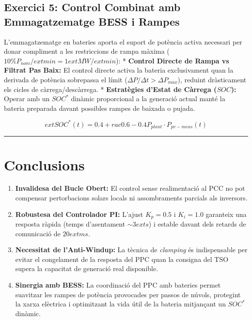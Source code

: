 \documentclass[
  catalan,
  letterpaper,
  DIV=11,
  numbers=noendperiod]{scrartcl}
\providecommand{\tightlist}{%
  \setlength{\itemsep}{0pt}\setlength{\parskip}{0pt}}
\begin{document}
\subsection{Exercici 5: Control Combinat amb Emmagatzematge BESS i
Rampes}\label{exercici-5-control-combinat-amb-emmagatzematge-bess-i-rampes}

L'emmagatzematge en bateries aporta el suport de potència activa
necessari per donar compliment a les restriccions de rampa màxima
(\(10\% P_{nom}/  ext{min} = 1    ext{ MW}/   ext{min}\)): *
\textbf{Control Directe de Rampa vs Filtrat Pas Baix:} El control
directe activa la bateria exclusivament quan la derivada de potència
sobrepassa el límit (\(\Delta P / \Delta t > \Delta P_{max}\)), reduint
dràsticament els cicles de càrrega/descàrrega. * \textbf{Estratègies
d'Estat de Càrrega (\(SOC\)):} Operar amb un \(SOC^*\) dinàmic
proporcional a la generació actual manté la bateria preparada davant
possibles rampes de baixada o pujada.

\[  ext{SOC}^*(t) = 0.4 + rac{0.6-0.4}{P_{plant}} \cdot P_{pv-meas}(t)\]

\begin{center}\rule{0.5\linewidth}{0.5pt}\end{center}

\section{Conclusions}\label{conclusions}

\begin{enumerate}
\def\labelenumi{\arabic{enumi}.}
\tightlist
\item
  \textbf{Invalidesa del Bucle Obert:} El control sense realimentació al
  PCC no pot compensar pertorbacions solars locals ni assombraments
  parcials als inversors.
\item
  \textbf{Robustesa del Controlador PI:} L'ajust \(K_p = 0.5\) i
  \(K_i = 1.0\) garanteix una resposta ràpida (temps d'asentament
  \(\sim 3    ext{ s}\)) i estable davant dels retards de comunicació de
  \(20   ext{ ms}\).
\item
  \textbf{Necessitat de l'Anti-Windup:} La tècnica de \emph{clamping} és
  indispensable per evitar el congelament de la resposta del PPC quan la
  consigna del TSO supera la capacitat de generació real disponible.
\item
  \textbf{Sinergia amb BESS:} La coordinació del PPC amb bateries permet
  suavitzar les rampes de potència provocades per passos de núvols,
  protegint la xarxa elèctrica i optimitzant la vida útil de la bateria
  mitjançant un \(SOC^*\) dinàmic.
\end{enumerate}
\end{document}

